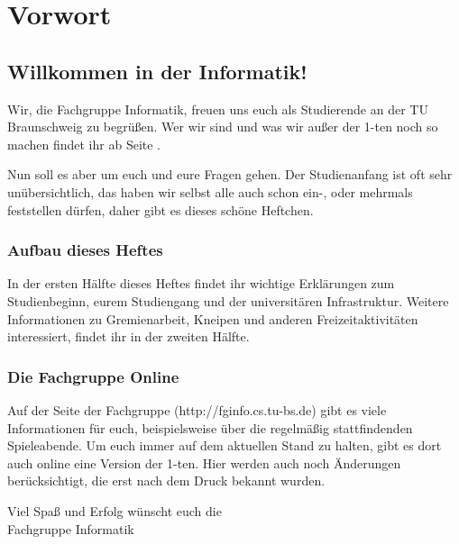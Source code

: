
\section{Vorwort}
\label{vorwort}
	\begin{multicols}{2}
	\subsection*{Willkommen in der Informatik!}	
	Wir, die Fachgruppe Informatik, freuen uns euch als Studierende an der TU Braunschweig zu begrüßen. Wer wir sind und was wir außer der 1-ten noch so machen findet ihr ab Seite \pageref{fachgruppe}.

	Nun soll es aber um euch und eure Fragen gehen. Der Studienanfang ist oft sehr unübersichtlich, das haben wir selbst alle auch schon ein-, oder mehrmals feststellen dürfen, daher gibt es dieses schöne Heftchen.

	\subsubsection*{Aufbau dieses Heftes}
		In der ersten Hälfte dieses Heftes findet ihr wichtige Erklärungen zum Studienbeginn, eurem Studiengang und der universitären Infrastruktur. Weitere Informationen zu Gremienarbeit, Kneipen und anderen Freizeitaktivitäten interessiert, findet ihr in der zweiten Hälfte.

	\subsubsection{Die Fachgruppe Online}

	Auf der Seite der Fachgruppe (http://fginfo.cs.tu-bs.de) gibt es viele Informationen für euch, beispielsweise über die regelmäßig stattfindenden Spieleabende. Um euch immer auf dem aktuellen Stand zu halten, gibt es dort auch online eine Version der 1-ten. Hier werden auch noch Änderungen berücksichtigt, die erst nach dem Druck bekannt wurden. 

	\vspace*{0.5cm}

	Viel Spaß und Erfolg wünscht euch die\\
	\hspace*{2cm}Fachgruppe Informatik
	\end{multicols}